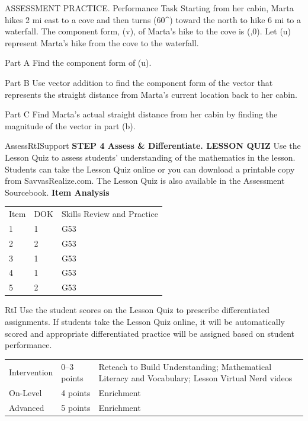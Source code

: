 \documentclass{article}
\newenvironment{practice}[2]{}{}        %
\newenvironment{te-addendum}[2]{}{}     %
\newcommand{\answer}[1]{}               %
\newcommand{\placeholder}[2]{}          %
\newcommand{\te}[1]{}                   %
\begin{document}
\begin{practice}{37}{2}
ASSESSMENT PRACTICE. Performance Task Starting from her cabin, Marta hikes 2 mi east to a cove and then turns (60^\circ) toward the north to hike 6 mi to a waterfall. The component form, (\vec v), of Marta's hike to the cove is (,0\rangle). Let (\vec u) represent Marta's hike from the cove to the waterfall.
\placeholder{map}{Illustrated landscape with cabin at origin, cove near (2,0), waterfall near (5,5), river, hills and another building at right. Overlaid unit coordinate grid with x-axis labels -2, O, 2,4,6,8,10, and y-axis labels 2,4,6. Black connected segments from closed point (0,0) to closed point (2,0), then to closed point approximately (5,5); terminal point corresponds to (5,3 sqrt(3)) in the problem. Axes have arrowheads, window approximately x=-3 to13, y=-2 to8.}
Part A Find the component form of (\vec u).
\answer{Part A (\langle3,3\sqrt3\rangle)}
Part B Use vector addition to find the component form of the vector that represents the straight distance from Marta's current location back to her cabin.
\answer{Part B (\langle5,3\sqrt3\rangle)}
\te{Printed positive vector points from the cabin to the waterfall; likely the vector back to the cabin should be (\langle-5,-3\sqrt3\rangle).}
Part C Find Marta's actual straight distance from her cabin by finding the magnitude of the vector in part (b).
\answer{Part C 7.2 mi}
\end{practice}
\begin{te-addendum}{Assess}{RtISupport}
\textbf{STEP 4 Assess & Differentiate. LESSON QUIZ}
Use the Lesson Quiz to assess students' understanding of the mathematics in the lesson.
Students can take the Lesson Quiz online or you can download a printable copy from SavvasRealize.com. The Lesson Quiz is also available in the Assessment Sourcebook.
\textbf{Item Analysis}
\begin{tabular}{lll}
Item & DOK & Skills Review and Practice \\
1 & 1 & G53 \\
2 & 2 & G53 \\
3 & 1 & G53 \\
4 & 1 & G53 \\
5 & 2 & G53 \\
\end{tabular}
RtI Use the student scores on the Lesson Quiz to prescribe differentiated assignments.
If students take the Lesson Quiz online, it will be automatically scored and appropriate differentiated practice will be assigned based on student performance.
\begin{tabular}{lll}
Intervention & 0--3 points & Reteach to Build Understanding; Mathematical Literacy and Vocabulary; Lesson Virtual Nerd videos \\
On-Level & 4 points & Enrichment \\
Advanced & 5 points & Enrichment \\
\end{tabular}
\end{te-addendum}
\end{document}
